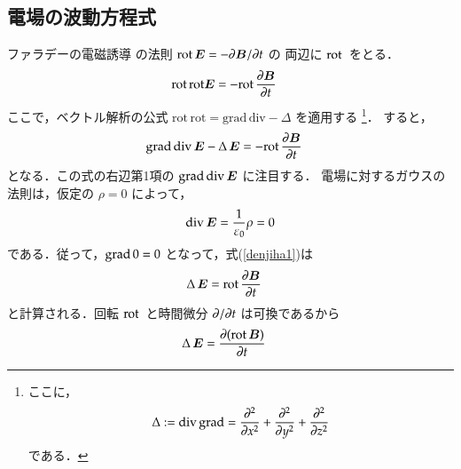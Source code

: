     \subsection{電場の波動方程式}
            ファラデーの電磁誘導
            の法則 $\mathrm{rot}\, \boldsymbol{E}=-\partial \boldsymbol{B}/\partial t$ の
            両辺に $\mathrm{rot}\,$ をとる．
                                    \begin{align}
                                    \mathrm{rot\,rot} \boldsymbol{E}
                                    &=
                                    -\mathrm{rot}\,\frac{\partial \boldsymbol{B}}{\partial t}
                                    \end{align}
            ここで，ベクトル解析の公式 $\mathrm{rot\, rot}=\mathrm{grad\, div}-\Delta$ を適用する
                \footnote{
                    ここに，
                        \begin{align*}
                            \Delta:=
                            \mathrm{div\, grad}=
                            \frac{\partial^{2}}{\partial x^{2}}+
                            \frac{\partial^{2}}{\partial y^{2}}+
                            \frac{\partial^{2}}{\partial z^{2}}
                        \end{align*}
                    である．
                }．
            すると，
            \begin{align}\label{denjiha1}
                \mathrm{grad\, div}\,\bE-\Delta\,\bE
                &=
                -\drot\frac{\rd \bB}{\rd t}
            \end{align}
            となる．この式の右辺第1項の $\mathrm{grad\, div}\,\boldsymbol{E}$ に注目する．
            電場に対するガウスの法則は，仮定の $\rho=0$ によって，
            \begin{align*}
                \mathrm{div}\,\boldsymbol{E}
                =\frac{1}{\varepsilon_{0}}\rho
                =0
            \end{align*}
            である．従って，$\mathrm{grad}\,0=0$ となって，式(\ref{denjiha1})は
            \begin{align}
                \Delta\,\boldsymbol{E}
                &=
                \mathrm{rot}\,\frac{\partial \boldsymbol{B}}{\partial t}
            \end{align}
            と計算される．回転 $\mathrm{rot}\,$ と時間微分 $\partial/\partial t$ は可換であるから
            \begin{align}\label{denjiha2}
                \Delta\,\bE
                &=
                \frac{\rd (\drot\bB)}{\rd t}
            \end{align}

